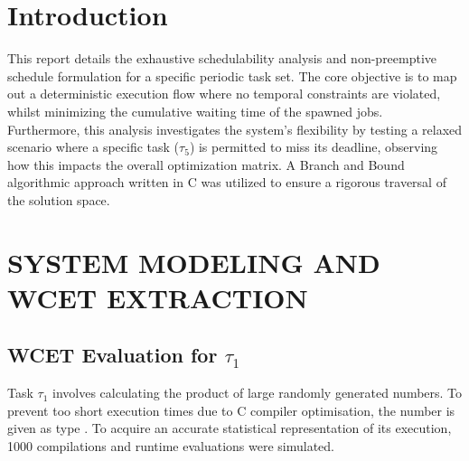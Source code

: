 \documentclass{report}
\renewcommand{\tablename}{Table}
\newcommand{\simplify}{%
 \cleardoublepage\ClearShipoutPictureBG
 }
\newcommand\AtPageUpperRight[1]{\AtPageUpperLeft{%
 \put(\LenToUnit{\paperwidth},\LenToUnit{0\paperheight}){#1}%
 }}%
\newcommand\AtPageLowerRight[1]{\AtPageLowerLeft{%
 \put(\LenToUnit{\paperwidth},\LenToUnit{0\paperheight}){#1}%
 }}%
\begin{document}



\renewcommand{\tablename}{Tableau}
\renewcommand{\lstlistingname}{Code}
\renewcommand{\contentsname}{\Huge SOMMAIRE}
\renewcommand{\chaptername}{CHAPITRE}
\renewcommand{\thechapter}{\Roman{chapter}}
\ChTitleVar{\bf\centering \Huge}
\ChNameVar{\bfseries\Huge\rmfamily}
\setlength{\headsep}{0cm}
\patchcmd{\chapter}{\thispagestyle{plain}}{\thispagestyle{fancy}} 
\tableofcontents

\chapter*{Introduction}

\AddToShipoutPictureBG{%
   \AtPageUpperLeft{\put(0,-25){\pgfornament[width=1.75cm]{61}}}
   \AtPageUpperRight{\put(-50,-25){\pgfornament[width=1.75cm,symmetry=v]{61}}}
   \AtPageLowerLeft{\put(0,25){\pgfornament[width=1.75cm,symmetry=h]{61}}}
   \AtPageLowerRight{\put(-50,25){\pgfornament[width=1.75cm,symmetry=c]{61}}}
   }


This report details the exhaustive schedulability analysis and non-preemptive schedule formulation for a specific periodic task set. The core objective is to map out a deterministic execution flow where no temporal constraints are violated, whilst minimizing the cumulative waiting time of the spawned jobs.\\

Furthermore, this analysis investigates the system's flexibility by testing a relaxed scenario where a specific task ($\tau_5$) is permitted to miss its deadline, observing how this impacts the overall optimization matrix. A Branch and Bound algorithmic approach written in C was utilized to ensure a rigorous traversal of the solution space.

\simplify


\chapter{SYSTEM MODELING AND WCET EXTRACTION}

\section{WCET Evaluation for $\tau_1$}
Task $\tau_{1}$ involves calculating the product of large randomly generated numbers. To prevent too short execution times due to C compiler optimisation, the number is given as type . To acquire an accurate statistical representation of its execution, 1000 compilations and runtime evaluations were simulated. \\
\end{document}
